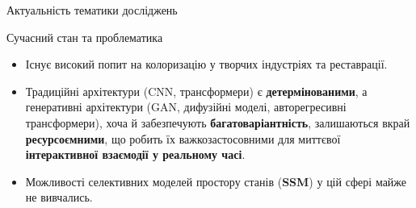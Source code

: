     

    

\begin{frame}{Актуальність тематики досліджень}
    \begin{block}{Сучасний стан та проблематика}
        \begin{itemize}
            \item Існує високий попит на колоризацію у творчих індустріях та реставрації.
            \item Традиційні архітектури (CNN, трансформери) є \textbf{детермінованими},
                а генеративні архітектури (GAN, дифузійні моделі, авторегресивні трансформери),
                хоча й забезпечують \textbf{багатоваріантність},
                залишаються вкрай \textbf{ресурсоємними},
                що робить їх важкозастосовними для миттєвої \textbf{інтерактивної взаємодії у реальному часі}.
            \item Можливості селективних моделей простору станів (\textbf{SSM}) у цій сфері майже не вивчались.
        \end{itemize}
    \end{block}
\end{frame}
